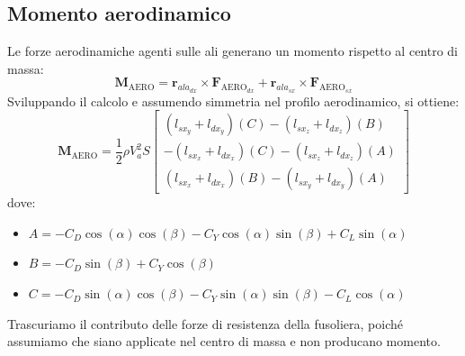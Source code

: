 \subsection{Momento aerodinamico}
Le forze aerodinamiche agenti sulle ali generano un momento rispetto al centro di massa:
\begin{equation}
    \bm{M}_{\text{AERO}} = \bm{r}_{ala_{dx}} \times \bm{F}_{\text{AERO}_{dx}} + \bm{r}_{ala_{sx}} \times \bm{F}_{\text{AERO}_{sx}} \label{eq:Maero_generale}
\end{equation}
Sviluppando il calcolo e assumendo simmetria nel profilo aerodinamico, si ottiene:
\begin{equation}
    \bm{M}_{\text{AERO}} = \frac{1}{2}\rho V_a^2 S 
    \begin{bmatrix} 
        (l_{sx_y}+l_{dx_y})(C) - (l_{sx_z}+l_{dx_z})(B) \\
        -(l_{sx_x}+l_{dx_x})(C) - (l_{sx_z}+l_{dx_z})(A) \\
        (l_{sx_x}+l_{dx_x})(B) - (l_{sx_y}+l_{dx_y})(A)
    \end{bmatrix} 
    \label{eq:M_aero_finale}
\end{equation}
dove:
\begin{itemize}
    \item $A = -C_D \cos(\alpha)\cos(\beta) - C_Y \cos(\alpha) \sin(\beta) + C_L \sin(\alpha)$
    \item $B = -C_D \sin(\beta) + C_Y \cos(\beta)$
    \item $C = -C_D \sin(\alpha)\cos(\beta) - C_Y \sin(\alpha) \sin(\beta) - C_L \cos(\alpha)$
\end{itemize}

Trascuriamo il contributo delle forze di resistenza della fusoliera, poiché assumiamo che siano applicate nel centro di massa e non producano momento.


